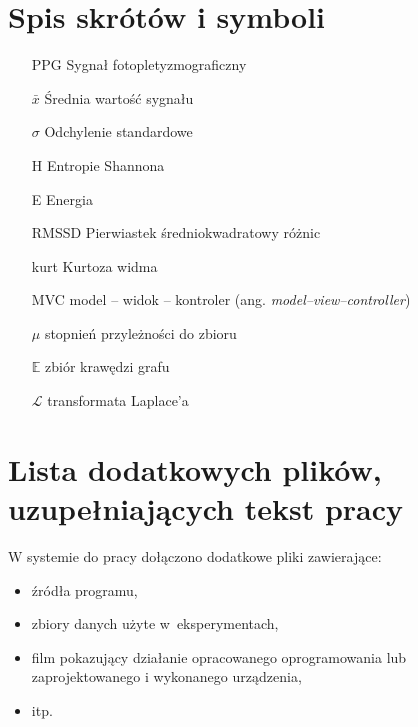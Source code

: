 \documentclass[a4paper,twoside,12pt]{book}
\newcommand{\obcy}[1]{\emph{#1}}
\newcommand{\english}[1]{{\selectlanguage{british}\obcy{#1}}}
\begin{document}
\begin{appendices}



	\chapter{Spis skrótów i symboli}

	\begin{itemize}
		\item[PPG] Sygnał fotopletyzmograficzny
		\item[$\bar{x}$] Średnia wartość sygnału
		\item[$\sigma$] Odchylenie standardowe
		\item[H] Entropie Shannona
		\item[E] Energia
		\item[RMSSD] Pierwiastek średniokwadratowy różnic
		\item[kurt] Kurtoza widma
		\item[MVC] model -- widok -- kontroler (ang. \english{model--view--controller})
		\item[$\mu$] stopnień przyleżności do zbioru
		\item[$\mathbb{E}$] zbiór krawędzi grafu
		\item[$\mathcal{L}$] transformata Laplace'a
	\end{itemize}

	\chapter{Lista dodatkowych plików, uzupełniających tekst pracy}

	W systemie do pracy dołączono dodatkowe pliki zawierające:
	\begin{itemize}
		\item źródła programu,
		\item zbiory danych użyte w~eksperymentach,
		\item film pokazujący działanie opracowanego oprogramowania lub zaprojektowanego i wykonanego urządzenia,
		\item itp.
	\end{itemize}


	\listoffigures
	\listoftables

\end{appendices}
\end{document}
